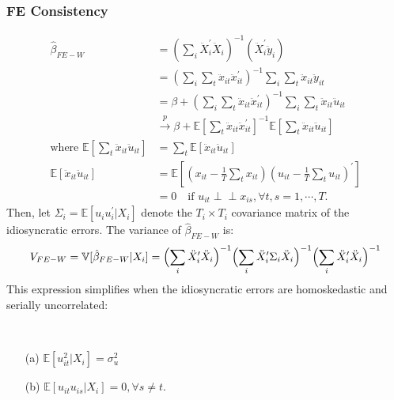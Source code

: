 \subsubsection{FE Consistency}
\begin{align*}
    \hat{\beta}_{FE-W} &= \left( \sum_{i} \ddot{X}_i^{\prime} \ddot{X}_i \right)^{-1} \left( \ddot{X}_i^{\prime} \ddot{y}_i \right) \\
    &= \left(\sum_i \sum_t \ddot{x}_{it} \ddot{x}_{it}^{\prime} \right)^{-1} \sum_i \sum_t \ddot{x}_{it} \ddot{y}_{it} \\
    &= \beta + \left(\sum_i \sum_t \ddot{x}_{it} \ddot{x}_{it}^{\prime} \right)^{-1} \sum_i \sum_t \ddot{x}_{it} \ddot{u}_{it} \\
    &\overset{p}{\rightarrow} \beta + \mathbb{E}\left[\sum_t \ddot{x}_{it} \ddot{x}_{it}^{\prime} \right]^{-1} \mathbb{E}\left[\sum_t \ddot{x}_{it} \ddot{u}_{it} \right] \\
    \text{where } \mathbb{E}\left[\sum_t \ddot{x}_{it} \ddot{u}_{it}\right] &= \sum_t \mathbb{E}\left[\ddot{x}_{it} \ddot{u}_{it} \right]\\
    \mathbb{E}\left[\ddot{x}_{it} \ddot{u}_{it} \right] &= \mathbb{E}\left[\left(x_{it} - \frac{1}{T}\sum_t x_{it} \right) \left(u_{it} - \frac{1}{T}\sum_t u_{it} \right)^{\prime} \right] \\
    &= 0 \quad \text{if } u_{it} \perp\!\!\!\perp x_{is}, \forall t, s = 1, \cdots, T.
\end{align*}
Then, let $\Sigma_i = \mathbb{E}[u_i u_i^{\prime} | X_i]$ denote the $T_i \times T_i$ covariance matrix of the idiosyncratic errors.
The variance of $\hat{\beta}_{FE-W}$ is:
\begin{gather*}
    V_{FE-W} = \mathbb{V}[\hat{\beta}_{FE-W} | X_i] = \Bigl( \sum_{i} \ddot{X}_i^{\prime} \ddot{X}_i \Bigr)^{-1} \Bigl( \sum_{i} \ddot{X}_i^{\prime} \Sigma_i \ddot{X}_i \Bigr)^{-1} \Bigl( \sum_{i} \ddot{X}_i^{\prime} \ddot{X}_i \Bigr)^{-1} 
\end{gather*}
This expression simplifies when the idiosyncratic errors are homoskedastic and serially uncorrelated:
\begin{assumption}\label{FE-homoskedasticity}
    \

    \begin{enumerate}
        \item[(a)] $\mathbb{E}[u_{it}^2 | X_i] = \sigma_u^2$ 
        \item[(b)] $\mathbb{E}[u_{it} u_{is} | X_i] = 0, \forall s \neq t.$
    \end{enumerate}
\end{assumption}

